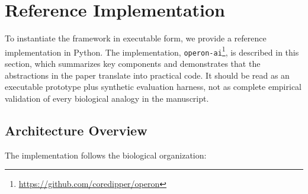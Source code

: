 \section{Reference Implementation}\label{sec:implementation}

To instantiate the framework in executable form, we provide a reference implementation in Python.
The implementation, \texttt{operon-ai}\footnote{\url{https://github.com/coredipper/operon}}, is described in this section,
which summarizes key components and demonstrates that the abstractions in the paper translate into practical code.
It should be read as an executable prototype plus synthetic evaluation harness, not as complete empirical
validation of every biological analogy in the manuscript.

\subsection{Architecture Overview}

The implementation follows the biological organization:

